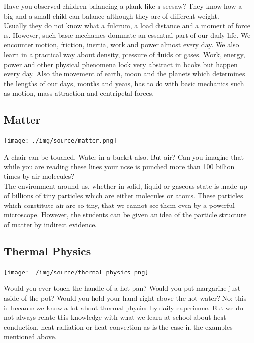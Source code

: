 \begin{multicols}{2}
Have you observed children balancing a plank like a seesaw? They know how a big and a
small child can balance although they are of different weight.\\

Usually they do not know what a fulcrum, a load distance and a moment of force is. However,
such basic mechanics dominate an essential part of our daily life. We encounter motion,
friction, inertia, work and power almost every day. We also learn in a practical way about
density, pressure of fluids or gases. Work, energy, power and other physical phenomena look
very abstract in books but happen every day. Also the movement of earth, moon and the
planets which determines the lengths of our days, months and years, has to do with basic
mechanics such as motion, mass attraction and centripetal forces.

\subsection{Matter}

\begin{center}
\texttt{[image: ./img/source/matter.png]}
\end{center}

A chair can be touched. Water in a bucket also. But air? Can you imagine that while you are
reading these lines your nose is punched more than 100 billion times by air molecules?\\

The environment around us, whether in solid, liquid or gaseous state is made up of billions of
tiny particles which are either molecules or atoms. These particles which constitute air are so
tiny, that we cannot see them even by a powerful microscope. However, the students can be
given an idea of the particle structure of matter by indirect evidence.

\subsection{Thermal Physics}

\begin{center}
\texttt{[image: ./img/source/thermal-physics.png]}
\end{center}

Would you ever touch the handle of a hot pan? Would you put margarine just aside
of the pot? Would you hold your hand right above the hot water? No; this is
because we know a lot about thermal physics by daily experience. But we do not always
relate this knowledge with what we learn at school about heat conduction, heat radiation or
heat convection as is the case in the examples mentioned above.\\


\end{multicols}
